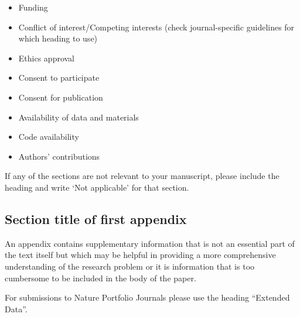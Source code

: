 \documentclass[sn-apa,pdflatex]{sn-jnl}
\theoremstyle{remark}
\theoremstyle{definition}
\providecommand{\tightlist}{%
  \setlength{\itemsep}{0pt}\setlength{\parskip}{0pt}}
\begin{document}
\begin{itemize}
\tightlist
\item
  Funding
\item
  Conflict of interest/Competing interests (check journal-specific
  guidelines for which heading to use)
\item
  Ethics approval
\item
  Consent to participate
\item
  Consent for publication
\item
  Availability of data and materials
\item
  Code availability
\item
  Authors' contributions
\end{itemize}

\noindent If any of the sections are not relevant to your manuscript,
please include the heading and write `Not applicable' for that section.

\begin{appendices}

\hypertarget{secA1}{%
\section{Section title of first appendix}\label{secA1}}

An appendix contains supplementary information that is not an essential
part of the text itself but which may be helpful in providing a more
comprehensive understanding of the research problem or it is information
that is too cumbersome to be included in the body of the paper.

For submissions to Nature Portfolio Journals please use the heading
``Extended Data''.

\end{appendices}


\end{document}

